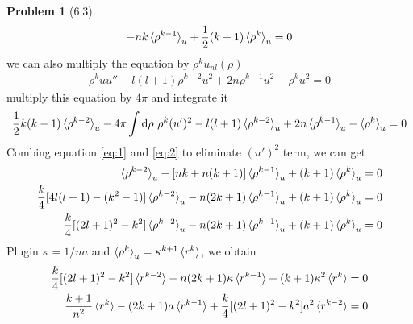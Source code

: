 \documentclass[twoside,11pt]{article}
\renewcommand*\d{\mathop{}\!\mathrm{d}}
\theoremstyle{definition}
\newtheorem{problem}{Problem}
\theoremstyle{remark}
\begin{document}
\begin{problem}[6.3]
\begin{align}
    - nk\braket{\rho^{k-1}}_u + \frac{1}{2}(k+1)\braket{\rho^k}_u = 0
    \label{eq:1}
\end{align}
we can also multiply the equation by $\rho^k u_{nl}(\rho)$
\begin{align*}
    \rho^kuu'' - l(l+1)\rho^{k-2}u^2 + 2n\rho^{k-1}u^2 - \rho^k u^2 = 0
\end{align*}
multiply this equation by $4\pi$ and integrate it
\begin{align}
    \frac{1}{2}k(k-1)\braket{\rho^{k-2}}_u -4\pi\int\d\rho\ \rho^k (u')^2
    - l(l+1)\braket{\rho^{k-2}}_u + 2n\braket{\rho^{k-1}}_u
    - \braket{\rho^k}_u = 0
    \label{eq:2}
\end{align}
Combing equation \ref{eq:1} and \ref{eq:2} to eliminate $(u')^2$ term, we can get
\begin{align*}
    [\frac{1}{2}(k-1)l(l+1) - \frac{1}{4}k(k^2-1)+\frac{1}{2}l(l+1)(k+1)]\braket{\rho^{k-2}}_u 
    - [nk+n(k+1)]\braket{\rho^{k-1}}_u + (k+1)\braket{\rho^k}_u &= 0\\
    \frac{k}{4}[4l(l+1)-(k^2-1)]\braket{\rho^{k-2}}_u - n(2k+1)\braket{\rho^{k-1}}_u
    +(k+1)\braket{\rho^k}_u &= 0\\
    \frac{k}{4}[(2l+1)^2 - k^2]\braket{\rho^{k-2}}_u - n(2k+1)\braket{\rho^{k-1}}_u
    + (k+1)\braket{\rho^k}_u &= 0
\end{align*}
Plugin $\kappa = 1/na$ and $\braket{\rho^k}_u = \kappa^{k+1}\braket{r^k}$, we obtain
\begin{align*}
    \frac{k}{4}[(2l+1)^2 - k^2]\braket{r^{k-2}} - n(2k+1)\kappa\braket{r^{k-1}}
    + (k+1)\kappa^2\braket{r^k} &= 0\\
    \frac{k+1}{n^2}\braket{r^k} - (2k+1)a\braket{r^{k-1}} + \frac{k}{4}[(2l+1)^2 - k^2]a^2\braket{r^{k-2}}
    &= 0
\end{align*}


\end{problem}
\end{document}
